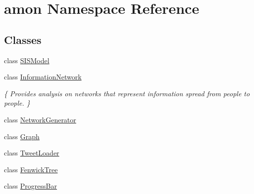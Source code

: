 \hypertarget{namespaceamon}{\section{amon Namespace Reference}
\label{namespaceamon}
}
\subsection*{Classes}
\begin{DoxyCompactItemize}
\item 
class \hyperlink{classamon_1_1_s_i_s_model}{S\-I\-S\-Model}
\item 
class \hyperlink{classamon_1_1_information_network}{Information\-Network}
\begin{DoxyCompactList}\small\item\em \{ Provides analysis on networks that represent information spread from people to people. \} \end{DoxyCompactList}\item 
class \hyperlink{classamon_1_1_network_generator}{Network\-Generator}
\item 
class \hyperlink{classamon_1_1_graph}{Graph}
\item 
class \hyperlink{classamon_1_1_tweet_loader}{Tweet\-Loader}
\item 
class \hyperlink{classamon_1_1_fenwick_tree}{Fenwick\-Tree}
\item 
class \hyperlink{classamon_1_1_progress_bar}{Progress\-Bar}
\end{DoxyCompactItemize}
